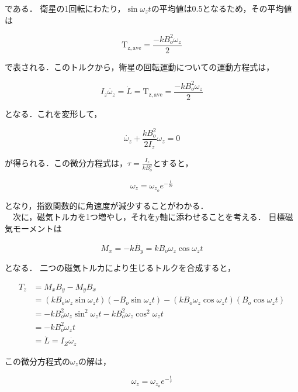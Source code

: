 である．
衛星の1回転にわたり，$\sin\omega_zt$の平均値は0.5となるため，その平均値は

\begin{equation}
    \mathrm{T_\mathrm{z,ave}} = \frac{-kB_o^2\omega_z}{2}
\end{equation}

で表される．このトルクから，衛星の回転運動についての運動方程式は，

\begin{equation}
    I_z\dot{\omega_z} = \dot{L} = \mathrm{T_\mathrm{z,ave}} = \frac{-kB_o^2\omega_z}{2}
\end{equation}

となる．これを変形して，

\begin{equation}
    \dot{\omega_z}+\frac{kB_o^2}{2I_z}\omega_z = 0
\end{equation}

が得られる．この微分方程式は，$\tau=\frac{I_z}{kB_o^2}$とすると，

\begin{equation}
    \omega_z = \omega_{z_o}e^{-\frac{t}{2\tau}} 
\end{equation}

となり，指数関数的に角速度が減少することがわかる．\\
　次に，磁気トルカを1つ増やし，それをy軸に添わせることを考える．
目標磁気モーメントは

\begin{equation}
    M_x = -k\dot{B_y} = kB_o\omega_z\cos\omega_zt
\end{equation}

となる．
二つの磁気トルカにより生じるトルクを合成すると，

\begin{equation}
    \begin{aligned}
        T_z &= M_xB_y - M_yB_x\\
            &= (kB_o\omega_z\sin\omega_zt)(-B_o\sin\omega_zt)-(kB_o\omega_z\cos\omega_zt)(B_o\cos\omega_zt)\\
            &= -kB_o^2\omega_z\sin^2\omega_zt - kB_o^2\omega_z\cos^2\omega_zt\\
            &= -kB_o^2\omega_zt\\
            &= \dot{L} = I_Z\dot{\omega_z}
    \end{aligned}
\end{equation}

この微分方程式の$\omega_z$の解は，

\begin{equation}
    \omega_z = \omega_{z_o}e^{-\frac{t}{\tau}} 
\end{equation}

